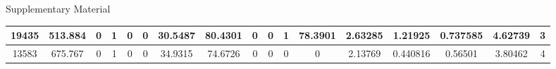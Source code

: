 \begin{wcfChaps}{Supplementary Material}
\begin{sidewaystable}
{\begin{tabular}{|c|c|c|c|c|c|c|c|c|c|c|c|c|c|c|c|c|}
19435 & 513.884 & 0 & 1 & 0 & 0 & 30.5487 & 80.4301 & 0 & 0 & 1 & 78.3901 & 2.63285 & 1.21925 & 0.737585 & 4.62739 & 3 \\\hline
13583 & 675.767 & 0 & 1 & 0 & 0 & 34.9315 & 74.6726 & 0 & 0 & 0 & 0 & 2.13769 & 0.440816 & 0.56501 & 3.80462 & 4 \\\hline

\end{tabular}
}
\end{sidewaystable}


\end{wcfChaps}
